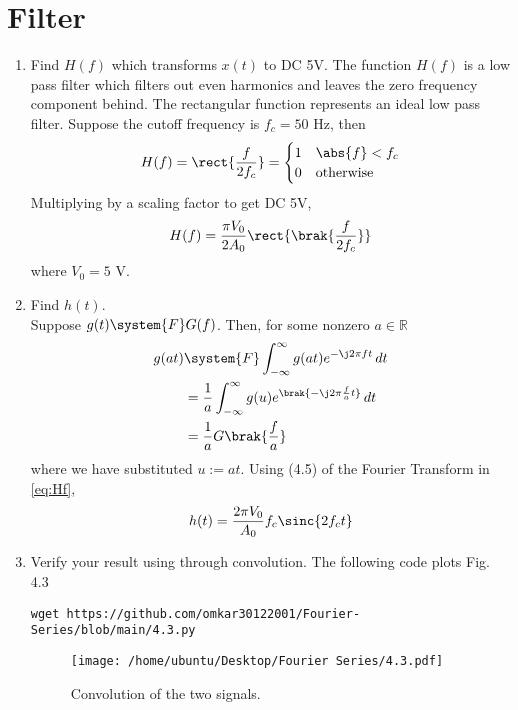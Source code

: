 \documentclass[journal,12pt,twocolumn]{IEEEtran}
\renewcommand\thesection{\arabic{section}}
\begin{document}
\section{Filter}
\begin{enumerate}[label=\thesection.\arabic*
,ref=\thesection.\theenumi]
\item Find $H(f)$ which transforms $x(t)$ to DC 5V.
\solution
The function $H(f)$ is a low pass filter which filters out
even harmonics and leaves the zero frequency component behind.
The rectangular function represents an ideal low pass filter. 
Suppose the cutoff frequency is $f_c = 50$ Hz, then
\begin{align}
	H(f) = \rect{\frac{f}{2f_c}} =
	\begin{cases}
		1 & \abs{f} < f_c \\
		0 & \textrm{otherwise}
	\end{cases}
	\label{eq:Hf}
\end{align}
Multiplying by a scaling factor to get DC 5V,
\begin{align}
	H(f) = \frac{\pi V_0}{2A_0}\rect{\brak{\frac{f}{2f_c}}}
\end{align}
where $V_0 = 5$ V.
\item Find $h(t)$. \\
\solution
Suppose $g(t)\system{F}G(f)$. Then, for some
nonzero $a \in \mathbb{R}$
\begin{align}
	g(at)&\system{F}\int_{-\infty}^{\infty}g(at)e^{-\j2\pi ft}\, dt \\
	&=\frac{1}{a}\int_{-\infty}^{\infty}g(u)e^{\brak{-\j2\pi \frac{f}{a}t}}\, dt \\
	&=\frac{1}{a}G\brak{\frac{f}{a}}
	\label{eq:t-scaling}
\end{align}
where we have substituted $u := at$. Using (4.5) of the Fourier Transform in \eqref{eq:Hf},
\begin{equation}
	h(t) = \frac{2\pi V_0}{A_0}f_c\sinc{2f_ct}
\end{equation}
\item Verify your result using  through convolution.
\solution
The following code plots Fig. 4.3
\begin{lstlisting}
wget https://github.com/omkar30122001/Fourier-Series/blob/main/4.3.py
\end{lstlisting}
\begin{figure}[!ht]
	\texttt{[image: /home/ubuntu/Desktop/Fourier Series/4.3.pdf]}
	\caption{Convolution of the two signals.}
	\label{eq:fig-conv}
\end{figure}
\end{enumerate}
\end{document}
